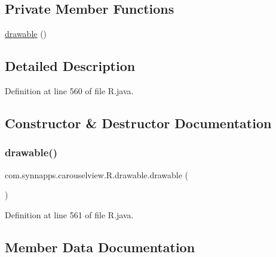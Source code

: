 \subsection*{Private Member Functions}
\begin{DoxyCompactItemize}
\item 
\mbox{\hyperlink{classcom_1_1synnapps_1_1carouselview_1_1_r_1_1drawable_a89f1401c36ccf738c4a639f7ced3dbe2}{drawable}} ()
\end{DoxyCompactItemize}


\subsection{Detailed Description}


Definition at line 560 of file R.\+java.



\subsection{Constructor \& Destructor Documentation}
\mbox{\label{classcom_1_1synnapps_1_1carouselview_1_1_r_1_1drawable_a89f1401c36ccf738c4a639f7ced3dbe2}} 
\subsubsection{\texorpdfstring{drawable()}{drawable()}}
{\footnotesize\ttfamily com.\+synnapps.\+carouselview.\+R.\+drawable.\+drawable (\begin{DoxyParamCaption}{ }\end{DoxyParamCaption})\hspace{0.3cm}{\ttfamily [private]}}



Definition at line 561 of file R.\+java.


\begin{DoxyCode}{0}

\end{DoxyCode}


\subsection{Member Data Documentation}
\mbox{\label{classcom_1_1synnapps_1_1carouselview_1_1_r_1_1drawable_a14acbd3e8cc264687ca05c8a84b34702}} 
